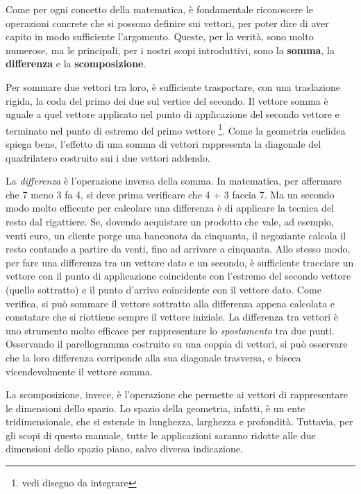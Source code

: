 Come per ogni concetto della matematica, è fondamentale riconoscere le operazioni concrete che si possono definire sui vettori, per poter dire di aver capito in modo sufficiente l'argomento.\newline
Queste, per la verità, sono molto numerose, ma le principali, per i nostri scopi introduttivi, sono la {\bfseries somma}, la {\bfseries differenza} e la {\bfseries scomposizione}.\newline

Per sommare due vettori tra loro, è sufficiente trasportare, con una traslazione rigida, la coda del primo dei due sul vertice del secondo. Il vettore somma è uguale a quel vettore applicato nel punto di applicazione del secondo vettore e terminato nel punto di estremo del primo vettore \footnote {vedi disegno da integrare}. Come la geometria euclidea spiega bene, l'effetto di una somma di vettori rappresenta la diagonale del quadrilatero costruito sui i due vettori addendo.\newline
\newline

La {\slshape differenza} è l'operazione inversa della somma. In matematica, per affermare che 7 meno 3 fa 4, si deve prima verificare che 4 + 3 faccia 7. Ma
un secondo modo molto efficente per calcolare una differenza è di applicare la tecnica del resto dal rigattiere.\newline
Se, dovendo acquistare un prodotto che vale, ad esempio, venti euro, un cliente porge una banconota da cinquanta, il negoziante calcola il resto contando a partire da venti, fino ad arrivare a cinquanta.
Allo stesso modo, per fare una differenza tra un vettore  dato e un secondo, è sufficiente tracciare un vettore con il punto di applicazione coincidente con l'estremo del secondo vettore (quello sottratto) e il punto d'arrivo coincidente con il vettore dato.\newline
Come verifica, si può sommare il vettore sottratto alla differenza appena calcolata e constatare che si riottiene sempre il vettore iniziale.\newline
La differenza tra vettori è uno strumento molto efficace per rappresentare lo {\slshape spostamento} tra due punti.\newline
Osservando il parellogramma costruito su una coppia di vettori, si può osservare che la loro differenza corriponde alla sua diagonale trasversa, e biseca vicendevolmente il vettore somma.
\newline

La scomposizione, invece, è l'operazione che permette ai vettori di rappresentare le dimensioni dello spazio.\newline
Lo spazio della geometria, infatti, è un ente tridimensionale, che si estende in lunghezza, larghezza e profondità.\newline
Tuttavia, per gli scopi di questo manuale, tutte le applicazioni saranno ridotte alle due dimensioni dello spazio piano, salvo diversa indicazione.
\newline

